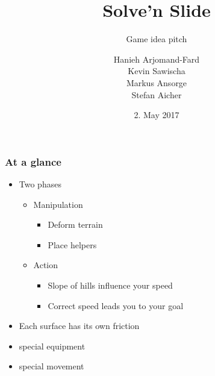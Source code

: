 \documentclass[xcolor=dvipsnames]{beamer}
\title{Solve'n Slide}
\subtitle{Game idea pitch}
\author{Hanieh Arjomand-Fard\\Kevin Sawischa\\Markus Ansorge\\Stefan Aicher}
\date{2. May 2017}
\begin{document}
	\maketitle
	
	\begin{frame}
		\frametitle{At a glance}
		\begin{itemize}
			\setlength\itemsep{1em}
			\item Two phases
			\begin{itemize}
				\item Manipulation
				\begin{itemize}
					\item Deform terrain
					\item Place helpers
				\end{itemize}
			\end{itemize}
			\begin{itemize}
				\item Action
				\begin{itemize}
					\item Slope of hills influence your speed
					\item Correct speed leads you to your goal
				\end{itemize}
			\end{itemize}
			\item Each surface has its own friction
			\item special equipment
			\item special movement
		\end{itemize}
	\end{frame}
	
\end{document}
